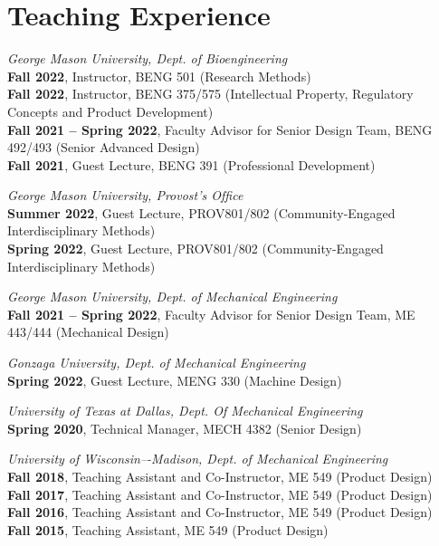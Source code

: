\documentclass[letterpaper, 10pt]{article}
\begin{document}
\section{Teaching Experience}

\textit{George Mason University, Dept. of Bioengineering}\\
\textbf{Fall 2022}, Instructor, BENG 501 (Research Methods)\\
\textbf{Fall 2022}, Instructor, BENG 375/575 (Intellectual Property, Regulatory Concepts and Product Development)\\
\textbf{Fall 2021 -- Spring 2022}, Faculty Advisor for Senior Design Team, BENG 492/493 (Senior Advanced Design)\\ 
\textbf{Fall 2021}, Guest Lecture, BENG 391 (Professional Development)

\bigskip

\textit{George Mason University, Provost’s Ofﬁce}\\
\textbf{Summer 2022}, Guest Lecture, PROV801/802 (Community-Engaged Interdisciplinary Methods)\\
\textbf{Spring 2022}, Guest Lecture, PROV801/802 (Community-Engaged Interdisciplinary Methods)

\bigskip

\textit{George Mason University, Dept. of Mechanical Engineering}\\
\textbf{Fall 2021 -- Spring 2022}, Faculty Advisor for Senior Design Team, ME 443/444 (Mechanical Design)

\bigskip

\textit{Gonzaga University, Dept. of Mechanical Engineering}\\
\textbf{Spring 2022}, Guest Lecture, MENG 330 (Machine Design)

\bigskip

\textit{University of Texas at Dallas, Dept. Of Mechanical Engineering}\\
\textbf{Spring 2020}, Technical Manager, MECH 4382 (Senior Design)

\bigskip

\textit{University of Wisconsin–-Madison, Dept. of Mechanical Engineering}\\
\textbf{Fall 2018}, Teaching Assistant and Co-Instructor, ME 549 (Product Design)\\
\textbf{Fall 2017}, Teaching Assistant and Co-Instructor, ME 549 (Product Design)\\ 
\textbf{Fall 2016}, Teaching Assistant and Co-Instructor, ME 549 (Product Design)\\ 
\textbf{Fall 2015}, Teaching Assistant, ME 549 (Product Design)
\end{document}
